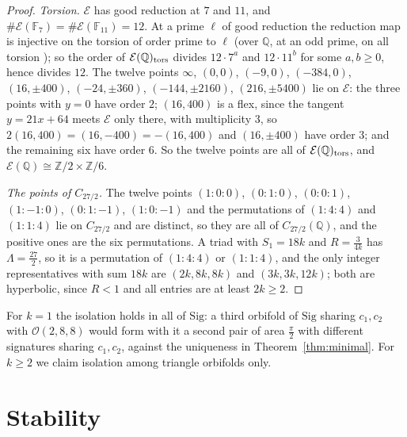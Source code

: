 \documentclass[pdflatex,sn-mathphys-num]{sn-jnl}
\theoremstyle{thmstyleone}%
\theoremstyle{thmstylethree}%
\newcommand{\Orb}{\mathcal{O}}
\newcommand{\Sig}{\mathrm{Sig}}
\newcommand{\Q}{\mathbb{Q}}
\newcommand{\Z}{\mathbb{Z}}
\begin{document}
\begin{proof}
\emph{Torsion.} $\mathcal E$ has good reduction at $7$ and $11$, and $\#\mathcal E(\mathbb F_7)=\#\mathcal E(\mathbb F_{11})=12$. At a prime $\ell$ of good reduction the reduction map is injective on the torsion of order prime to $\ell$ \cite[Prop.~VII.3.1(b)]{silverman2009} (over $\Q$, at an odd prime, on all torsion \cite[\S3.3, p.~70]{cremona1997}); so the order of $\mathcal E(\Q)_{\rm tors}$ divides $12\cdot7^a$ and $12\cdot11^b$ for some $a,b\ge0$, hence divides $12$. The twelve points $\infty$, $(0,0)$, $(-9,0)$, $(-384,0)$, $(16,\pm400)$, $(-24,\pm360)$, $(-144,\pm2160)$, $(216,\pm5400)$ lie on $\mathcal E$: the three points with $y=0$ have order $2$; $(16,400)$ is a flex, since the tangent $y=21x+64$ meets $\mathcal E$ only there, with multiplicity $3$, so $2(16,400)=(16,-400)=-(16,400)$ and $(16,\pm400)$ have order $3$; and the remaining six have order $6$. So the twelve points are all of $\mathcal E(\Q)_{\rm tors}$, and $\mathcal E(\Q)\cong\Z/2\times\Z/6$.

\emph{The points of $C_{27/2}$.} The twelve points $(1:0:0)$, $(0:1:0)$, $(0:0:1)$, $(1:-1:0)$, $(0:1:-1)$, $(1:0:-1)$ and the permutations of $(1:4:4)$ and $(1:1:4)$ lie on $C_{27/2}$ and are distinct, so they are all of $C_{27/2}(\Q)$, and the positive ones are the six permutations. A triad with $S_1=18k$ and $R=\frac3{4k}$ has $\Lambda=\frac{27}2$, so it is a permutation of $(1:4:4)$ or $(1:1:4)$, and the only integer representatives with sum $18k$ are $(2k,8k,8k)$ and $(3k,3k,12k)$; both are hyperbolic, since $R<1$ and all entries are at least $2k\ge2$.
\end{proof}

For $k=1$ the isolation holds in all of $\Sig$: a third orbifold of $\Sig$ sharing $c_1,c_2$ with $\Orb(2,8,8)$ would form with it a second pair of area $\frac\pi2$ with different signatures sharing $c_1,c_2$, against the uniqueness in Theorem~\ref{thm:minimal}. For $k\ge2$ we claim isolation among triangle orbifolds only.

\section{Stability}\label{sec:stabsummary}
\end{document}
